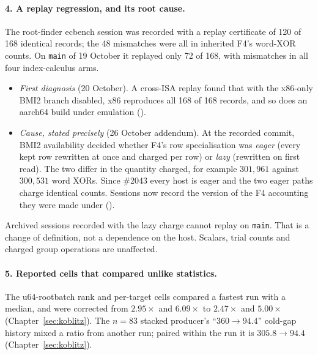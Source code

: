 \begin{table}[t]
\centering\small
\setlength{\tabcolsep}{3.5pt}

\caption[]{Round-5 boundary reports re-priced against the matched rho. $S$
in GAE per $\sqrt r$; $S_{\rm IC}$: best of nine recipes; frozen $S_\rho$:
the plain walk used through \S17; matched $S_\rho$: the negation-map walk.
The ladder rows are leaderboard Table~B
(Table~\ref{tab:fr-boardB}). Source:
(\texttt{tables.boundary}). Data: .}
\label{tab:fr-reprice}
\end{table}

\paragraph{4. A replay regression, and its root cause.} The root-finder
ecbench session was recorded with a replay certificate of 120 of 168
identical records; the 48 mismatches were all in inherited F4's word-XOR
counts. On \texttt{main} of 19 October it replayed only 72 of 168, with
mismatches in all four index-calculus arms.
\begin{itemize}
\item \emph{First diagnosis} (20 October). A cross-ISA replay found that
  with the x86-only BMI2 branch disabled, x86 reproduces all 168 of 168
  records, and so does an aarch64 build under emulation
  ().
\item \emph{Cause, stated precisely} (26 October addendum). At the recorded
  commit, BMI2 availability decided whether F4's row specialisation was
  \emph{eager} (every kept row rewritten at once and charged per row) or
  \emph{lazy} (rewritten on first read). The two differ in the quantity
  charged, for example $301{,}961$ against $300{,}531$ word XORs. Since
  \#2043 every host is eager and the two eager paths charge identical
  counts. Sessions now record the version of the F4 accounting they were
  made under
  ().
\end{itemize}
Archived sessions recorded with the lazy charge cannot replay on
\texttt{main}. That is a change of definition, not a dependence on the host.
Scalars, trial counts and charged group operations are unaffected.

\paragraph{5. Reported cells that compared unlike statistics.} The
u64-rootbatch rank and per-target cells compared a fastest run with a
median, and were corrected from $2.95\times$ and $6.09\times$ to $2.47\times$
and $5.00\times$ (Chapter~\ref{sec:koblitz}). The $n=83$ stacked producer's
``$360\to94.4$'' cold-gap history mixed a ratio from another run; paired
within the run it is $305.8\to94.4$ (Chapter~\ref{sec:koblitz}).

